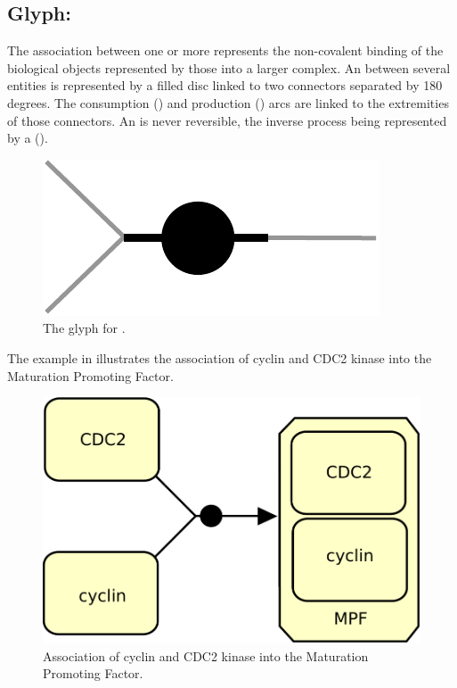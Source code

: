 
\subsection{Glyph: }\label{sec:association}

The association between one or more  represents the non-covalent binding of the biological objects represented by those  into a larger complex. An  between several entities is represented by a filled disc linked to two connectors separated by 180 degrees. The consumption () and production () arcs are linked to the extremities of those connectors. An  is never reversible, the inverse process being represented by a  ().

\begin{figure}[H]
  \centering
  \includegraphics[scale = 0.5]{images/association}
  \caption{The \PD glyph for .}
  \label{fig:association}
\end{figure}

The example in  illustrates the association of cyclin and CDC2 kinase into the Maturation Promoting Factor.

\begin{figure}[H]
  \centering
  \includegraphics[scale = 0.5]{images/association-MPF}
  \caption{Association of cyclin and CDC2 kinase into the Maturation Promoting Factor.}
  \label{fig:assoc-cyclin}
\end{figure}

